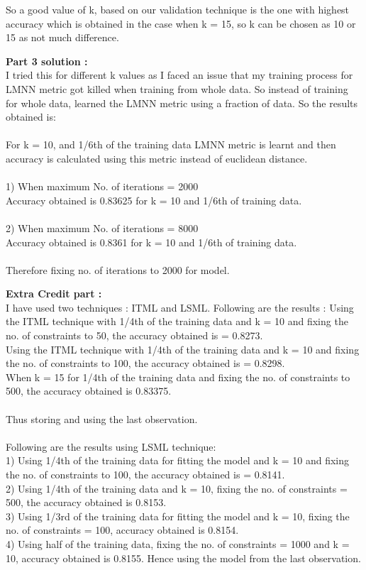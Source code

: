 \documentclass[a4paper,11pt]{article}
\begin{document}
\begin{mlsolution}
So a good value of k, based on our validation technique is the one with highest accuracy which is obtained in the case when k = 15, so k can be chosen as 10 or 15 as not much difference.

\newpage

\textbf{Part 3 solution :}\\

I tried this for different k values as I faced an issue that my training process for LMNN metric got killed when training from whole data. So instead of training for whole data, learned the LMNN metric using a fraction of data. So the results obtained is:\\\\For k = 10, and 1/6th of the training data LMNN metric is learnt and then accuracy is calculated using this metric instead of euclidean distance.\\\\1) When maximum No. of iterations = 2000\\Accuracy obtained is 0.83625 for k = 10 and 1/6th of training data.\\\\2) When maximum No. of iterations = 8000\\Accuracy obtained is 0.8361 for k = 10 and 1/6th of training data.\\\\Therefore fixing no. of iterations to 2000 for model.
\newpage 

\textbf{Extra Credit part :}\\

I have used two techniques : ITML and LSML. Following are the results : 
Using the ITML technique with 1/4th of the training data and k = 10 and fixing the no. of constraints to 50, the accuracy obtained is = 0.8273.\\Using the ITML technique with 1/4th of the training data and k = 10 and fixing the no. of constraints to 100, the accuracy obtained is = 0.8298.\\ When k = 15 for 1/4th of the training data and fixing the no. of constraints to 500, the accuracy obtained is 0.83375. \\\\Thus storing and using the last observation.
\\\\Following are the results using LSML technique:\\
1) Using  1/4th of the training data for fitting the model and k = 10 and fixing the no. of constraints to 100, the accuracy obtained is =  0.8141. \\2) Using 1/4th of the training data and k = 10, fixing the no. of constraints = 500, the accuracy obtained is 0.8153. \\3) Using 1/3rd of the training data for fitting the model and k = 10, fixing the no. of constraints = 100, accuracy obtained is 0.8154.\\4) Using half of the training data, fixing the no. of constraints = 1000 and k = 10, accuracy obtained is 0.8155. Hence using the model from the last observation.

\end{mlsolution}
\end{document}
